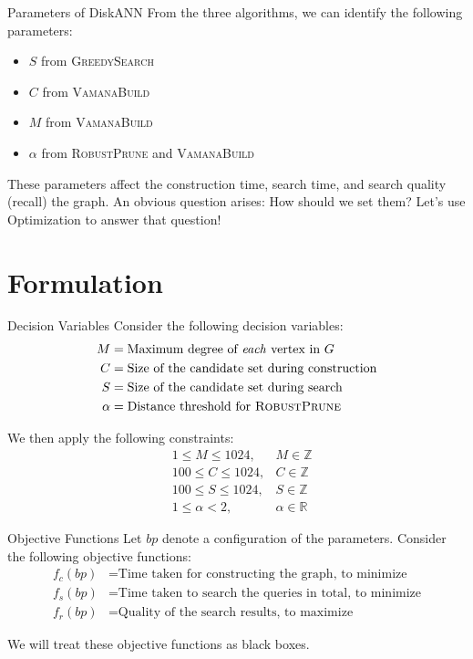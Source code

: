 \documentclass{beamer}
\begin{document}
\begin{frame}{Parameters of DiskANN}
    From the three algorithms, we can identify the following parameters:
    \begin{itemize}
        \item \(S\) from \textsc{GreedySearch}
        \item \(C\) from \textsc{VamanaBuild}
        \item \(M\) from \textsc{VamanaBuild}
        \item \(\alpha\) from \textsc{RobustPrune} and \textsc{VamanaBuild}
    \end{itemize}

    These parameters affect the construction time, search time, and search quality (recall) the graph. An obvious question arises: How should we set them? Let's use Optimization to answer that question!
\end{frame}

\section{Formulation}

\begin{frame}{Decision Variables}
    Consider the following decision variables:
    \[
    \begin{aligned}
        M &= \text{Maximum degree of \textit{each} vertex in \(G\)} \\
        C &= \text{Size of the candidate set during construction} \\
        S &= \text{Size of the candidate set during search} \\
        \alpha &= \text{Distance threshold for \textsc{RobustPrune}}
    \end{aligned}
    \]
    
    We then apply the following constraints:
    \[
    \begin{aligned}
        &1 \leq M \leq 1024, & M \in \mathbb{Z} \\
        &100 \leq C \leq 1024, & C \in \mathbb{Z} \\
        &100 \leq S \leq 1024, & S \in \mathbb{Z} \\
        &1 \leq \alpha < 2, &\alpha \in \mathbb{R}
    \end{aligned}
    \]
\end{frame}

\begin{frame}{Objective Functions}
    Let \(bp\) denote a configuration of the parameters. Consider the following objective functions:
    \[
    \begin{aligned}
        f_c(bp) &= \text{Time taken for constructing the graph, to minimize} \\
        f_s(bp) &= \text{Time taken to search the queries in total, to minimize} \\
        f_r(bp) &= \text{Quality of the search results, to maximize}
    \end{aligned}
    \]

    We will treat these objective functions as black boxes.
\end{frame}
\end{document}
